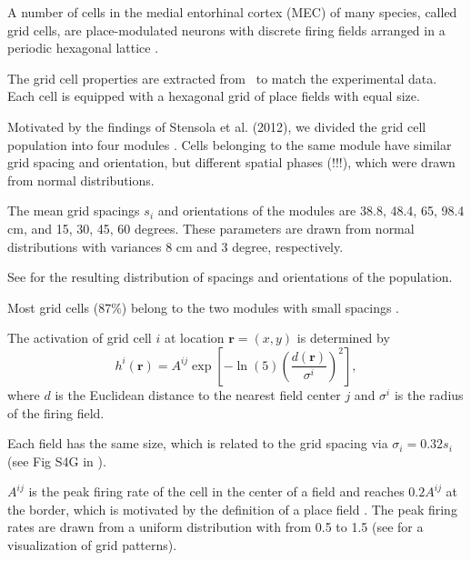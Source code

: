 \documentclass[utf8]{frontiersSCNS} %
\begin{document}


A number of cells in the medial entorhinal cortex (MEC) of many species, called grid cells, are place-modulated neurons with discrete firing fields arranged in a periodic hexagonal lattice \cite{hafting2005microstructure}.  

The grid cell properties are extracted from~\cite{stensola2012entorhinal} to match the experimental data.
Each cell is equipped with a hexagonal grid of place fields with equal size.

Motivated by the findings of Stensola et al. (2012), we divided the grid cell population into four modules \cite{stensola2012entorhinal}. Cells belonging to the same module have similar grid spacing and orientation, but different spatial phases (!!!), which were drawn from normal distributions. 

The mean grid spacings $s_i$ and orientations of the modules are 38.8, 48.4, 65, 98.4 cm, and 15, 30, 45, 60 degrees. These parameters are drawn from normal distributions with variances 8 cm and 3 degree, respectively.

See \cite[Fig 1B-1C]{neher2015memory} for the resulting distribution of spacings and orientations of the population.

Most grid cells ($87\%$) belong to the two modules with small spacings \cite{stensola2012entorhinal}. 

The activation of grid cell $i$ at location $\mathbf{r}=(x,y)$ is determined by
\begin{equation}
\label{eq:grid}
h^i(\mathbf{r}) = A^{ij} \exp \left[ -\ln(5) \left(\frac{d(\mathbf{r})}{\sigma^i}\right)^2 \right],
\end{equation}
where $d$ is the Euclidean distance to the nearest field center $j$ and $\sigma^i$ is the radius of the firing field.

Each field has the same size, which is related to the grid spacing via $ \sigma_i  = 0.32 s_i $ (see Fig
S4G in \cite{hafting2005microstructure}). 

$A^{ij}$ is the peak firing rate of the cell in the center of a field and reaches $0.2 A^{ij}$ at the border, which is motivated by the definition of a place field \cite{hafting2005microstructure}. The peak firing rates are drawn from a uniform distribution with from 0.5 to 1.5 (see \cite{neher2015memory} for a visualization of grid patterns).  
\end{document}
